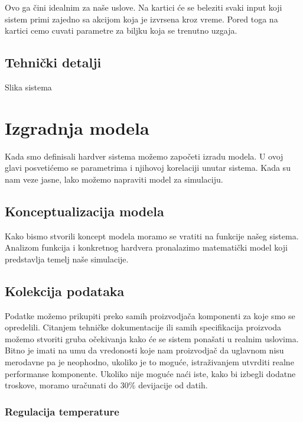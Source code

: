 \documentclass[a4paper,11pt]{book}
\begin{document}
Ovo ga čini idealnim za naše uslove. Na kartici će se beleziti svaki input koji sistem primi zajedno sa akcijom koja je izvrsena kroz vreme. Pored toga na kartici cemo cuvati parametre za biljku koja se trenutno uzgaja.

\section{Tehnički detalji}

Slika sistema

\chapter{Izgradnja modela}

Kada smo definisali hardver sistema možemo započeti izradu modela. U ovoj glavi posvetićemo se parametrima i njihovoj korelaciji unutar sistema. Kada su nam veze jasne, lako možemo napraviti model za simulaciju.

\section{Konceptualizacija modela}

Kako bismo stvorili koncept modela moramo se vratiti na funkcije našeg sistema. Analizom funkcija i konkretnog hardvera pronalazimo matematički model koji predstavlja temelj naše simulacije.\\


\section{Kolekcija podataka}

Podatke možemo prikupiti preko samih proizvodjača komponenti za koje smo se opredelili. Citanjem tehničke dokumentacije ili samih specifikacija proizvoda možemo stvoriti gruba očekivanja kako će se sistem ponašati u realnim uslovima. \\

\noindent Bitno je imati na umu da vredonosti koje nam proizvodjač da uglavnom nisu merodavne pa je neophodno, ukoliko je to moguće, istraživanjem utvrditi realne performanse komponente. Ukoliko nije moguće naći iste, kako bi izbegli dodatne troskove, moramo uračunati do 30\% devijacije od datih.

\subsection{Regulacija temperature}
\end{document}
